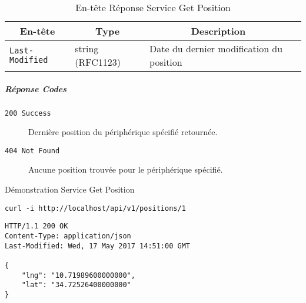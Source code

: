 \begin{table}[htbp]
    \centering
    \caption*{En-tête Réponse Service Get Position}
    \begin{tabular}{llll}
        \toprule
        \multicolumn{1}{c}{\textbf{En-tête}} &
        \multicolumn{1}{c}{\textbf{Type}} &
        \multicolumn{1}{c}{\textbf{Description}} \\
        \midrule
        \verb|Last-Modified| & string (RFC1123) & Date du dernier modification du position \\
        \bottomrule
    \end{tabular}
\end{table}

\subparagraph*{Réponse Codes}
\begin{description}
    \item[\texttt{200 Success}] Dernière position du périphérique spécifié retournée.
    \item[\texttt{404 Not Found}] Aucune position trouvée pour le périphérique spécifié.
\end{description}

\begin{listing}
    \caption*{Démonstration Service Get Position}
    \begin{verbatim}
curl -i http://localhost/api/v1/positions/1
\end{verbatim}
\begin{verbatim}
HTTP/1.1 200 OK
Content-Type: application/json
Last-Modified: Wed, 17 May 2017 14:51:00 GMT

{
    "lng": "10.71989600000000",
    "lat": "34.72526400000000"
}
\end{verbatim}
\end{listing}

